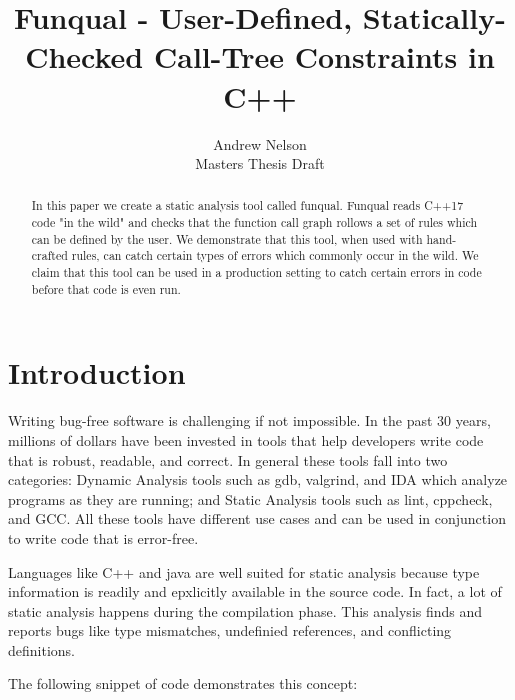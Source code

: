 \documentclass{article}
\begin{document}
  \begin{titlepage}
    \title{Funqual - User-Defined, Statically-Checked Call-Tree Constraints in C++}

    \author{Andrew Nelson\\Masters Thesis Draft}

    \maketitle

    \begin{abstract}
      In this paper we create a static analysis tool called funqual.  Funqual reads C++17 code "in the wild" and checks that the function call graph rollows a set of rules which can be defined by the user.  We demonstrate that this tool, when used with hand-crafted rules, can catch certain types of errors which commonly occur in the wild.  We claim that this tool can be used in a production setting to catch certain errors in code before that code is even run.  
    \end{abstract}
  \end{titlepage}

  \newpage
  \tableofcontents
  \newpage

  \twocolumn


  \section{Introduction}

  Writing bug-free software is challenging if not impossible.  In the past 30 years, millions of dollars have been invested in tools that help developers write code that is robust, readable, and correct.  In general these tools fall into two categories:  Dynamic Analysis tools such as gdb, valgrind, and IDA which analyze programs as they are running; and Static Analysis tools such as lint, cppcheck, and GCC.  All these tools have different use cases and can be used in conjunction to write code that is error-free.

  Languages like C++ and java are well suited for static analysis because type information is readily and epxlicitly available in the source code.  In fact, a lot of static analysis happens during the compilation phase.  This analysis finds and reports bugs like type mismatches, undefinied references, and conflicting definitions.  

  The following snippet of code demonstrates this concept:
\end{document}
